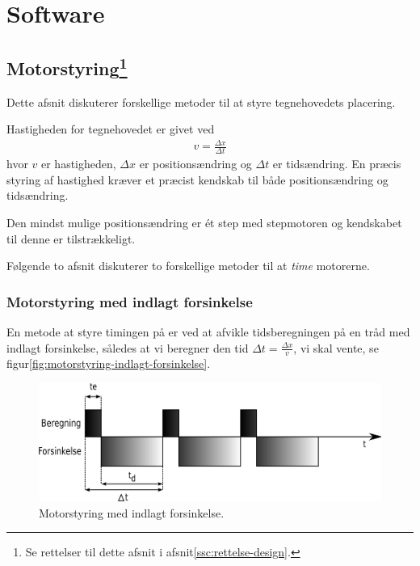 \chapter[Design af software]{Software}



\section[Motorstyring]{Motorstyring\footnote{Se rettelser til dette
    afsnit i afsnit\vref{ssc:rettelse-design}.}}


Dette afsnit diskuterer forskellige metoder til at styre tegnehovedets
placering.

Hastigheden for tegnehovedet er givet ved
\begin{align}
  v = \frac{\Delta x}{\Delta t} \label{eq:hastighed}
\end{align}
hvor $v$ er hastigheden, $\Delta x$ er positionsændring og $\Delta t$ er
tidsændring. En præcis styring af hastighed kræver et præcist kendskab
til både positionsændring og tidsændring.

Den mindst mulige positionsændring er ét step med stepmotoren og
kendskabet til denne er tilstrækkeligt.

Følgende to afsnit diskuterer to forskellige metoder til at
\textit{time} motorerne.


\subsection{Motorstyring med indlagt forsinkelse}

En metode at styre timingen på er ved at afvikle tidsberegningen på en
tråd med indlagt forsinkelse, således at vi beregner den tid $\Delta t
= \frac{\Delta x}{v}$, vi skal vente, se
figur\vref{fig:motorstyring-indlagt-forsinkelse}.

\begin{figure}[htbp]
  \centering
  \includegraphics[width=.5\textwidth]{./img/motorstyring-indlagt-forsinkelse}
  \caption{Motorstyring med indlagt forsinkelse.}
  \label{fig:motorstyring-indlagt-forsinkelse}
\end{figure}


